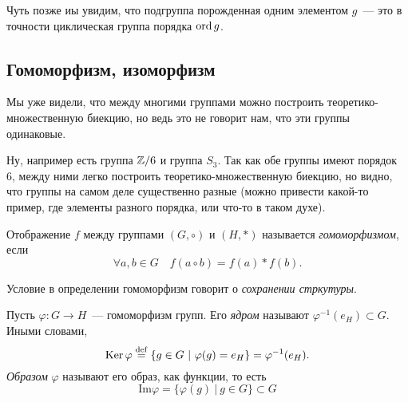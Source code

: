 	Чуть позже иы увидим, что подгруппа порожденная одним элементом $g$~--- это в точности циклическая группа порядка $\operatorname{ord}{g}$. 

	\subsection{Гомоморфизм, изоморфизм}

	Мы уже видели, что между многими группами можно построить теоретико-множественную биекцию, но ведь это не говорит нам, что эти группы одинаковые. 

	\begin{example}
		Ну, например есть группа $\mathbb{Z}/6$ и группа $S_{3}$. Так как обе группы имеют порядок 6, между ними легко построить теоретико-множественную биекцию, но видно, что группы на самом деле существенно разные (можно привести какой-то пример, где элементы разного порядка, или что-то в таком духе). 
	\end{example}

	\begin{definition} 
		Отображение $f$ между группами $(G, \circ)$ и $(H, *)$ называется \emph{гомоморфизмом}, если 
		\[
			\forall a, b \in G \quad  f(a \circ b) = f(a) * f(b).
		\]
	\end{definition}

	Условие в определении гомоморфизм говорит о \emph{сохранении стркутуры}. 

	\begin{definition} 
		Пусть $\varphi\colon G \to H$~--- гомоморфизм групп. Его \emph{ядром} называют $\varphi^{-1}(e_{H}) \subset G$. Иными словами, 
		\[
			\operatorname{Ker}{\varphi} \stackrel{\mathrm{def}}{=} \{ g \in G \ \vert\  \varphi(g) = e_{H} \} = \varphi^{-1}(e_{H}).
		\]
		\emph{Образом} $\varphi$ называют его образ, как функции, то есть 
		\[
			\mathrm{Im}{\varphi} = \{ \varphi(g) \ \vert\  g \in G \} \subset G
		\]
	\end{definition}
	

	